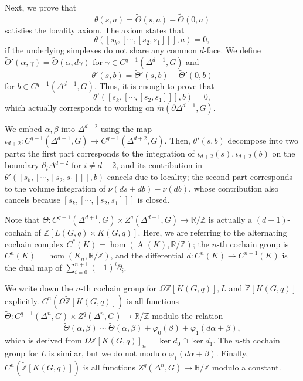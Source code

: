 \documentclass[reprint, amsmath, amssymb, showpacs, floatfix, longbibliography, aps, twocolumn, superscriptaddress, nofootinbib]{revtex4-2}
\newcommand{\ZZ}{{\mathbb Z}}
\newcommand{\RR}{{\mathbb R}}
\newcommand{\tZ}{{\widetilde{\mathbb Z}}}
\theoremstyle{definition}
\begin{document}
Next, we prove that
\begin{equation}
	\theta(s,a)=\tilde{\Theta}(s,a)-\tilde{\Theta}(0,a)
\end{equation}
satisfies the locality axiom. The axiom states that 
\begin{equation}
	\theta([s_k,[\cdots,[s_2,s_1]]],a)=0,
\end{equation}
if the underlying simplexes do not share any common $d$-face. We define $\tilde{\Theta}'(\alpha,\gamma)=\tilde{\Theta}(\alpha,d\gamma)$ for $\gamma\in C^{q-1}(\Delta^{d+1},G)$ and
\begin{equation}
	\theta'(s,b)=\tilde{\Theta}'(s,b)-\tilde{\Theta}'(0,b)
\end{equation}
 for $b\in C^{q-1}(\Delta^{d+1},G)$. Thus, it is enough to prove that
\begin{equation}
	\theta'([s_k,[\cdots,[s_2,s_1]]],b)=0,
\end{equation}
which actually corresponds to working on $\tilde{m}(\partial\Delta^{d+1},G)$.

We embed $\alpha,\beta$ into $\Delta^{d+2}$ using the map $\iota_{d+2}:C^{q-1}(\Delta^{d+1},G)\rightarrow C^{q-1}(\Delta^{d+2},G)$. Then, $\theta'(s,b)$ decompose into two parts: the first part corresponds to the integration of $\iota_{d+2}(s),\iota_{d+2}(b)$ on the boundary $\partial_i\Delta^{d+2}$ for $i\ne d+2$, and its contribution in $\theta'([s_k,[\cdots,[s_2,s_1]]],b)$ cancels due to locality; the second part corresponds to the volume integration of $\nu(ds+db)-\nu(db)$, whose contribution also cancels because $[s_k,[\cdots,[s_2,s_1]]]$ is closed.

Note that $\tilde{\Theta}:C^{q-1}(\Delta^{d+1},G)\times Z^q(\Delta^{d+1},G)\rightarrow\RR/\ZZ$ is actually a $(d+1)$-cochain of $\ZZ[L(G,q)\times K(G,q)]$.
 Here, we are referring to the alternating cochain complex $C^*(K)=\hom(\operatorname{A}(K),\RR/\ZZ)$; the  $n$-th cochain group is $C^n(K)=\hom (K_n,\RR/\ZZ)$, and the differential $d:C^n(K)\rightarrow C^{n+1}(K)$ is the dual map of $\sum_{i=0}^{n+1}(-1)^i\partial_i$. 

  We write down the $n$-th cochain group for $\Omega\tZ[K(G,q)], L$ and $\tZ[K(G,q)]$ explicitly. $C^n(\Omega\tZ[K(G,q)])$ is all functions $\tilde\Theta:C^{q-1}(\Delta^n,G)\times Z^q(\Delta^n,G)\rightarrow\RR/\ZZ$ modulo the relation
\begin{equation}
	\tilde\Theta(\alpha,\beta)\sim \tilde\Theta(\alpha,\beta)+\varphi_0(\beta)+\varphi_1(d\alpha+\beta),
\end{equation}
which is derived from $\Omega\tZ[K(G,q)]_n=\ker d_0\cap \ker d_1$. The $n$-th cochain group for $L$ is similar, but we do not modulo $\varphi_1(d\alpha+\beta)$. Finally, $C^n(\tZ[K(G,q)])$ is all functions $Z^q(\Delta^n,G)\rightarrow \RR/\ZZ$ modulo a constant.
\end{document}
